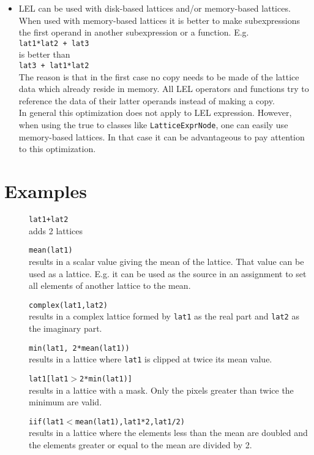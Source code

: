 \begin{itemize}
\item
LEL can be used with disk-based lattices and/or memory-based lattices.
When used with memory-based lattices it is better to make
subexpressions the first operand in another subexpression or a
function. E.g.
\\\texttt{lat1*lat2 + lat3}
\\is better than
\\\texttt{lat3 + lat1*lat2}
\\The reason is that in the first case no copy needs to be made of the
lattice data which already reside in memory. All LEL operators and
functions try to reference the data of their latter operands instead
of making a copy.
\\In general this optimization does not apply to LEL expression.
However, when using the true 
to classes like \texttt{LatticeExprNode}, one can easily use
memory-based lattices. In that case it can be advantageous to pay
attention to this optimization.

\end{itemize}


\section{Examples}
\begin{description}
  \item[] \texttt{lat1+lat2}
    \\adds 2 lattices
  \item[] \texttt{mean(lat1)}
    \\results in a scalar value giving the mean of the lattice.
    That value can be used as a lattice. E.g. it can be used as
    the source in an assignment to set all elements of another
    lattice to the mean.
  \item[] \texttt{complex(lat1,lat2)}
    \\results in a complex lattice formed by \texttt{lat1} as the
    real part and \texttt{lat2} as the imaginary part.
  \item[] \texttt{min(lat1, 2*mean(lat1))}
    \\results in a lattice where \texttt{lat1} is clipped at twice
    its mean value.
  \item[] \texttt{lat1[lat1$>$2*min(lat1)]}
    \\results in a lattice with a mask. Only the pixels
    greater than twice the minimum are valid.
  \item[] \texttt{iif(lat1$<$mean(lat1),lat1*2,lat1/2)}
    \\results in a lattice where the elements less than the mean
    are doubled and the elements greater or equal to the mean are
    divided by 2.
\end{description}

